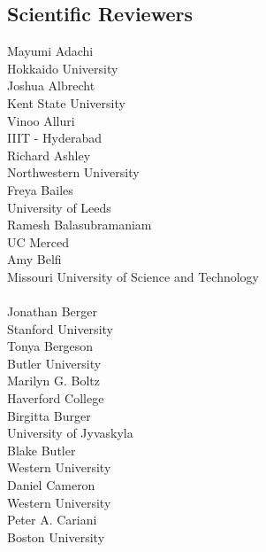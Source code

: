 \begin{multicols}{2}
\subsection*{Scientific Reviewers}
Mayumi Adachi\\
\vspace{.5em}Hokkaido University\\
Joshua Albrecht\\
\vspace{.5em}Kent State University\\
Vinoo Alluri\\
\vspace{.5em}IIIT - Hyderabad\\
Richard Ashley\\
\vspace{.5em}Northwestern University\\
Freya Bailes\\
\vspace{.5em}University of Leeds\\
Ramesh Balasubramaniam\\
\vspace{.5em}UC Merced\\
Amy Belfi\\
\vspace{.5em}Missouri University of Science and Technology\\
\\Jonathan Berger\\
\vspace{.5em}Stanford University\\
Tonya Bergeson\\
\vspace{.5em}Butler University\\
Marilyn G. Boltz\\
\vspace{.5em}Haverford College\\
Birgitta Burger\\
\vspace{.5em}University of Jyvaskyla\\
Blake Butler\\
\vspace{.5em}Western University\\
Daniel Cameron\\
\vspace{.5em}Western University\\
Peter A. Cariani\\
\vspace{.5em}Boston University\\

\end{multicols}
